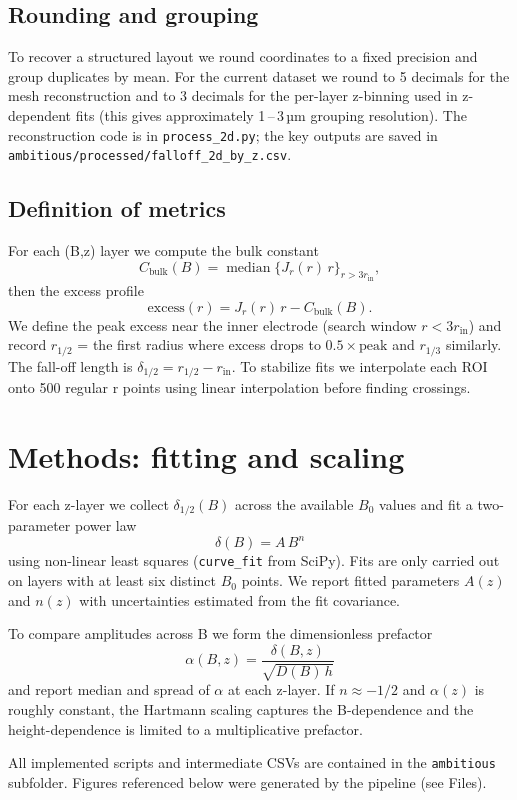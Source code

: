 \documentclass[11pt, a4paper]{article}
\begin{document}
\subsection{Rounding and grouping}
To recover a structured layout we round coordinates to a fixed precision and group
duplicates by mean. For the current dataset we round to 5 decimals for the mesh
reconstruction and to 3 decimals for the per-layer z-binning used in z-dependent
fits (this gives approximately 1\,--\,3\,µm grouping resolution). The reconstruction
code is in \texttt{process\_2d.py}; the key outputs are saved in
\texttt{ambitious/processed/falloff\_2d\_by\_z.csv}.

\subsection{Definition of metrics}
For each (B,z) layer we compute the bulk constant
$$C_{\mathrm{bulk}}(B)=\operatorname{median}\{J_r(r)\,r\}_{r>3r_{\mathrm{in}}},$$
then the excess profile
$$\mathrm{excess}(r)=J_r(r)\,r - C_{\mathrm{bulk}}(B).$$
We define the peak excess near the inner electrode (search window $r<3r_{\mathrm{in}}$)
and record $r_{1/2}$ = the first radius where excess drops to $0.5\times\mathrm{peak}$
and $r_{1/3}$ similarly. The fall-off length is $\delta_{1/2}=r_{1/2}-r_{\mathrm{in}}$.
To stabilize fits we interpolate each ROI onto 500 regular r points using
linear interpolation before finding crossings.

\section{Methods: fitting and scaling}
\label{sec:methods}
For each z-layer we collect $\delta_{1/2}(B)$ across the available $B_0$ values and
fit a two-parameter power law
$$\delta(B)=A\,B^{n}$$
using non-linear least squares (\texttt{curve\_fit} from SciPy). Fits are only carried
out on layers with at least six distinct $B_0$ points. We report fitted parameters
\(A(z)\) and \(n(z)\) with uncertainties estimated from the fit covariance.

To compare amplitudes across B we form the dimensionless prefactor
$$\alpha(B,z)=\frac{\delta(B,z)}{\sqrt{D(B)\,h}}$$
and report median and spread of $\alpha$ at each z-layer. If $n\approx-1/2$ and
$\alpha(z)$ is roughly constant, the Hartmann scaling captures the B-dependence and
the height-dependence is limited to a multiplicative prefactor.

All implemented scripts and intermediate CSVs are contained in the \texttt{ambitious}
subfolder. Figures referenced below were generated by the pipeline (see Files).
\end{document}
